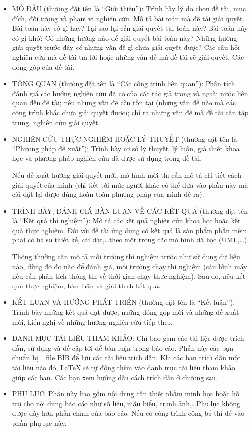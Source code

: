 \begin{itemize}
\item MỞ ĐẦU (thường đặt tên là ``Giới thiệu''): Trình bày lý do chọn đề tài, mục đích, đối tượng và phạm vi nghiên cứu.
Mô tả bài toán mà đề tài giải quyết. Bài toán này có gì hay? Tại sao lại cần giải quyết bài toán này? Bài toán này có gì khó? Có những hướng nào để giải quyết bài toán này? Những hướng giải quyết trước đây có những vấn đề gì chưa giải quyết được? Các câu hỏi nghiên cứu mà đề tài trả lời hoặc những vấn đề mà đề tài sẽ giải quyết. Các đóng góp của đề tài.

\item TỔNG QUAN (thường đặt tên là ``Các công trình liên quan''): Phân tích đánh giá các hướng nghiên cứu đã có của các tác giả trong và ngoài nước liên quan đến đề tài; nêu những vấn đề còn tồn tại (những vấn đề nào mà các công trình khác chưa giải quyết được); chỉ ra những vấn đề mà đề tài cần tập trung, nghiên cứu giải quyết.

\item NGHIÊN CỨU THỰC NGHIỆM HOẶC LÝ THUYẾT (thường đặt tên là ``Phương pháp đề xuất''): Trình bày cơ sở lý thuyết, lý luận, giả thiết khoa học và phương pháp nghiên cứu đã được sử dụng trong đề tài.

Nếu đề xuất hướng giải quyết mới, mô hình mới thì cần mô tả chi tiết cách giải quyết của mình (chi tiết tới mức người khác có thể dựa vào phần này mà cài đặt lại được đúng hoàn toàn phương pháp của mình đề ra).

\item TRÌNH BÀY, ĐÁNH GIÁ BÀN LUẬN VỀ CÁC KẾT QUẢ (thường đặt tên là ``Kết quả thí nghiệm''): Mô tả các kết quả nghiên cứu khoa học hoặc kết quả thực nghiệm.
Đối với đề tài ứng dụng có kết quả là sản phẩm phần mềm phải có hồ sơ thiết kế, cài đặt,\ldots theo một trong các mô hình đã học (UML,\ldots).

Thông thường cần mô tả môi trường thí nghiệm trước như sử dụng dữ liệu nào, dùng độ đo nào để đánh giá, môi trường chạy thí nghiệm (cấu hình máy nếu cần phân tích thông tin về thời gian chạy thực nghiệm). Sau đó, nêu kết quả thực nghiệm, bàn luận và giải thích kết quả.

\item KẾT LUẬN VÀ HƯỚNG PHÁT TRIỂN (thường đặt tên là ``Kết luận''): Trình bày những kết quả đạt được, những đóng góp mới và những đề xuất mới, kiến nghị về những hướng nghiên cứu tiếp theo.

\item DANH MỤC TÀI LIỆU THAM KHẢO: Chỉ bao gồm các tài liệu được trích dẫn, sử dụng và đề cập tới để bàn luận trong báo cáo.
Phần này các bạn chuẩn bị 1 file BIB để lưu các tài liệu trích dẫn. Khi các bạn trích dẫn một tài liệu nào đó, LaTeX sẽ tự động thêm vào danh mục tài liệu tham khảo giúp các bạn. Các bạn xem hướng dẫn cách trích dẫn ở chương sau.

\item PHỤ LỤC: Phần này bao gồm nội dung cần thiết nhằm minh họa hoặc hỗ trợ cho nội dung báo cáo như số liệu, mẫu biểu, tranh ảnh,\ldots Phụ lục không được dày hơn phần chính của báo cáo.
Nếu có công trình công bố thì để vào phần phụ lục này.
\end{itemize}


